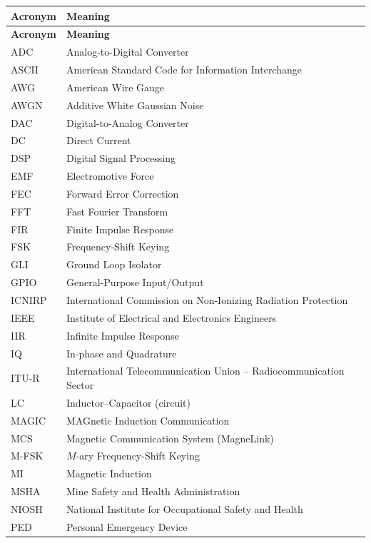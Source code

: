 \documentclass[
	english, %
	letterpaper, oneside
]{book}
\begin{document}
\renewcommand{\arraystretch}{1.25}
\begin{longtable}{@{}p{} p{}@{}}
\toprule
\textbf{Acronym} & \textbf{Meaning} \\
\midrule
\endfirsthead
\toprule
\textbf{Acronym} & \textbf{Meaning} \\
\midrule
\endhead
\bottomrule
\endfoot
ADC    & Analog-to-Digital Converter \\
ASCII  & American Standard Code for Information Interchange \\
AWG    & American Wire Gauge \\
AWGN   & Additive White Gaussian Noise \\
DAC    & Digital-to-Analog Converter \\
DC     & Direct Current \\
DSP    & Digital Signal Processing \\
EMF    & Electromotive Force \\
FEC    & Forward Error Correction \\
FFT    & Fast Fourier Transform \\
FIR    & Finite Impulse Response \\
FSK    & Frequency-Shift Keying \\
GLI    & Ground Loop Isolator \\
GPIO   & General-Purpose Input/Output \\
ICNIRP & International Commission on Non-Ionizing Radiation Protection \\
IEEE   & Institute of Electrical and Electronics Engineers \\
IIR    & Infinite Impulse Response \\
IQ     & In-phase and Quadrature \\
ITU-R  & International Telecommunication Union -- Radiocommunication Sector \\
LC     & Inductor--Capacitor (circuit) \\
MAGIC  & MAGnetic Induction Communication \\
MCS    & Magnetic Communication System (MagneLink) \\
M-FSK  & $M$-ary Frequency-Shift Keying \\
MI     & Magnetic Induction \\
MSHA   & Mine Safety and Health Administration \\
NIOSH  & National Institute for Occupational Safety and Health \\
PED    & Personal Emergency Device \\

\end{longtable}
\end{document}
